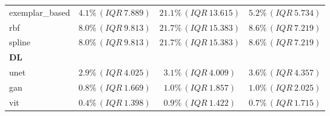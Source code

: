 \begin{table}[htbp]
{\begin{tabular}{lccc}
exemplar\_based & $4.1\%\,(IQR\ 7.889)$ & $21.1\%\,(IQR\ 13.615)$ & $5.2\%\,(IQR\ 5.734)$ \\
rbf & $8.0\%\,(IQR\ 9.813)$ & $21.7\%\,(IQR\ 15.383)$ & $8.6\%\,(IQR\ 7.219)$ \\
spline & $8.0\%\,(IQR\ 9.813)$ & $21.7\%\,(IQR\ 15.383)$ & $8.6\%\,(IQR\ 7.219)$ \\
\midrule
\multicolumn{4}{l}{\textbf{DL}} \\
unet & $2.9\%\,(IQR\ 4.025)$ & $3.1\%\,(IQR\ 4.009)$ & $3.6\%\,(IQR\ 4.357)$ \\
gan & $0.8\%\,(IQR\ 1.669)$ & $1.0\%\,(IQR\ 1.857)$ & $1.0\%\,(IQR\ 2.025)$ \\
vit & $0.4\%\,(IQR\ 1.398)$ & $0.9\%\,(IQR\ 1.422)$ & $0.7\%\,(IQR\ 1.715)$ \\
\bottomrule
\end{tabular}
}
\end{table}
